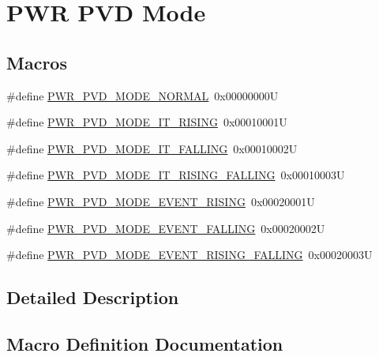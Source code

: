 \hypertarget{group___p_w_r___p_v_d___mode}{}\section{P\+WR P\+VD Mode}
\label{group___p_w_r___p_v_d___mode}
\subsection*{Macros}
\begin{DoxyCompactItemize}
\item 
\#define \hyperlink{group___p_w_r___p_v_d___mode_ga3a4bf701a36a14a4edf4dc5a28153277}{P\+W\+R\+\_\+\+P\+V\+D\+\_\+\+M\+O\+D\+E\+\_\+\+N\+O\+R\+M\+AL}~0x00000000U
\item 
\#define \hyperlink{group___p_w_r___p_v_d___mode_ga102d7b8354419990a2a780f61cd020a6}{P\+W\+R\+\_\+\+P\+V\+D\+\_\+\+M\+O\+D\+E\+\_\+\+I\+T\+\_\+\+R\+I\+S\+I\+NG}~0x00010001U
\item 
\#define \hyperlink{group___p_w_r___p_v_d___mode_gab600a54f3a588de836cfe4b727ab8a53}{P\+W\+R\+\_\+\+P\+V\+D\+\_\+\+M\+O\+D\+E\+\_\+\+I\+T\+\_\+\+F\+A\+L\+L\+I\+NG}~0x00010002U
\item 
\#define \hyperlink{group___p_w_r___p_v_d___mode_gac531fbf14457e6595505354fad521b67}{P\+W\+R\+\_\+\+P\+V\+D\+\_\+\+M\+O\+D\+E\+\_\+\+I\+T\+\_\+\+R\+I\+S\+I\+N\+G\+\_\+\+F\+A\+L\+L\+I\+NG}~0x00010003U
\item 
\#define \hyperlink{group___p_w_r___p_v_d___mode_ga1a946b01887aa886de329a92c3ab0dd4}{P\+W\+R\+\_\+\+P\+V\+D\+\_\+\+M\+O\+D\+E\+\_\+\+E\+V\+E\+N\+T\+\_\+\+R\+I\+S\+I\+NG}~0x00020001U
\item 
\#define \hyperlink{group___p_w_r___p_v_d___mode_gaaedbe45f1a1ea6c30af6ac51abae0cae}{P\+W\+R\+\_\+\+P\+V\+D\+\_\+\+M\+O\+D\+E\+\_\+\+E\+V\+E\+N\+T\+\_\+\+F\+A\+L\+L\+I\+NG}~0x00020002U
\item 
\#define \hyperlink{group___p_w_r___p_v_d___mode_ga7455387c8e9049f9f66b46423d4f4091}{P\+W\+R\+\_\+\+P\+V\+D\+\_\+\+M\+O\+D\+E\+\_\+\+E\+V\+E\+N\+T\+\_\+\+R\+I\+S\+I\+N\+G\+\_\+\+F\+A\+L\+L\+I\+NG}~0x00020003U
\end{DoxyCompactItemize}


\subsection{Detailed Description}


\subsection{Macro Definition Documentation}
\mbox{\label{group___p_w_r___p_v_d___mode_gaaedbe45f1a1ea6c30af6ac51abae0cae}} 
